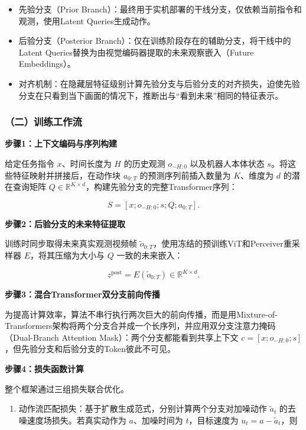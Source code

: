 \begin{itemize}
\tightlist
\item
  先验分支（Prior Branch）：最终用于实机部署的干线分支，仅依赖当前指令和观测，使用Latent Queries生成动作。
\item
  后验分支（Posterior Branch）：仅在训练阶段存在的辅助分支，将干线中的Latent Queries替换为由视觉编码器提取的未来观察嵌入（Future Embeddings）。
\item
  对齐机制：在隐藏层特征级别计算先验分支与后验分支的对齐损失，迫使先验分支在只看到当下画面的情况下，推断出与``看到未来''相同的特征表示。
\end{itemize}

\hypertarget{ux4e8cux8badux7ec3ux5de5ux4f5cux6d41}{%
\subsubsection{（二）训练工作流}\label{ux4e8cux8badux7ec3ux5de5ux4f5cux6d41}}

\textbf{步骤1：上下文编码与序列构建}

给定任务指令 \(x\)、时间长度为 \(H\) 的历史观测 \(o_{-H:0}\) 以及机器人本体状态 \(s\)。将这些特征映射并拼接后，在动作块 \(a_{0:T}\) 的预测序列前插入数量为 \(K\)、维度为 \(d\) 的潜在查询矩阵 \(Q\in\mathbb{R}^{K\times d}\)，构建先验分支的完整Transformer序列：

\[
S=[x;o_{-H:0};s;Q;a_{0:T}].
\]

\textbf{步骤2：后验分支的未来特征提取}

训练时同步取得未来真实观测视频帧 \(\tilde{o}_{0:T}\)，使用冻结的预训练ViT和Perceiver重采样器 \(E\)，将其压缩为大小与 \(Q\) 一致的未来嵌入：

\[
z^{\mathrm{post}}=E(\tilde{o}_{0:T})\in\mathbb{R}^{K\times d}.
\]

\textbf{步骤3：混合Transformer双分支前向传播}

为提高计算效率，算法不串行执行两次巨大的前向传播，而是用Mixture-of-Transformers架构将两个分支合并成一个长序列，并应用双分支注意力掩码（Dual-Branch Attention Mask）：两个分支都能看到共享上下文 \(c=[x;o_{-H:0};s]\)，但先验分支和后验分支的Token彼此不可见。

\textbf{步骤4：损失函数计算}

整个框架通过三组损失联合优化。

\begin{enumerate}
\def\labelenumi{\arabic{enumi}.}
\tightlist
\item
  动作流匹配损失：基于扩散生成范式，分别计算两个分支对加噪动作 \(\tilde a_t\) 的去噪速度场损失。若真实动作为 \(a\)、加噪时间为 \(t\)，目标速度为 \(u_t=a-\tilde a_t\)，则
\end{enumerate}

